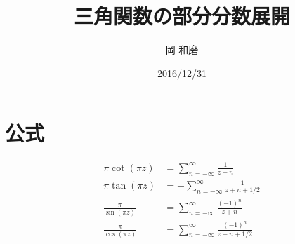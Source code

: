 \documentclass[10pt,onecolumn,dvipdfmx]{jsarticle}
\begin{document}
\title{三角関数の部分分数展開}
\author{岡 和磨}
\date{2016/12/31}
\maketitle

\section{公式}
\begin{align}
\pi \cot{\left( \pi z\right) } &= \sum_{n=-\infty } ^{\infty } \frac{1}{z + n} \\
\pi \tan{\left( \pi z\right) } &= -\sum_{n=-\infty } ^{\infty } \frac{1}{z + n + 1/2} \\
\frac{\pi }{\sin{\left( \pi z\right) } } &= \sum_{n=-\infty } ^{\infty } \frac{\left( -1\right) ^{n} }{z + n} \\
\frac{\pi }{\cos{\left( \pi z\right) } } &= \sum_{n=-\infty } ^{\infty } \frac{\left( -1\right) ^{n} }{z + n + 1 / 2} 
\end{align}
\end{document}
